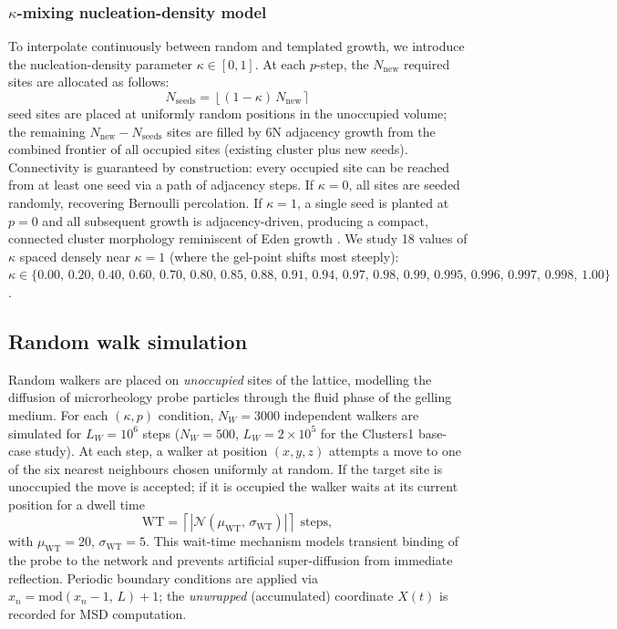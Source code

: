 \subsubsection{$\kappa$-mixing nucleation-density model}

To interpolate continuously between random and templated growth, we introduce the nucleation-density parameter $\kappa \in [0, 1]$. At each $p$-step, the $N_\mathrm{new}$ required sites are allocated as follows:
\begin{equation}
  N_\mathrm{seeds} = \left\lfloor (1-\kappa)\, N_\mathrm{new} \right\rceil
  \label{eq:nseeds}
\end{equation}
seed sites are placed at uniformly random positions in the unoccupied volume; the remaining $N_\mathrm{new} - N_\mathrm{seeds}$ sites are filled by 6N adjacency growth from the combined frontier of all occupied sites (existing cluster plus new seeds). Connectivity is guaranteed by construction: every occupied site can be reached from at least one seed via a path of adjacency steps. If $\kappa = 0$, all sites are seeded randomly, recovering Bernoulli percolation. If $\kappa = 1$, a single seed is planted at $p = 0$ and all subsequent growth is adjacency-driven, producing a compact, connected cluster morphology reminiscent of Eden growth \citep{Eden1961}. We study 18 values of $\kappa$ spaced densely near $\kappa = 1$ (where the gel-point shifts most steeply): $\kappa \in \{0.00,\, 0.20,\, 0.40,\, 0.60,\, 0.70,\, 0.80,\, 0.85,\, 0.88,\, 0.91,\, 0.94,\, 0.97,\, 0.98,\, 0.99,\, 0.995,\, 0.996,\, 0.997,\, 0.998,\, 1.00\}$.

\subsection{Random walk simulation}

Random walkers are placed on \emph{unoccupied} sites of the lattice, modelling the diffusion of microrheology probe particles through the fluid phase of the gelling medium. For each $(\kappa, p)$ condition, $N_W = 3000$ independent walkers are simulated for $L_W = 10^6$ steps ($N_W = 500$, $L_W = 2\times 10^5$ for the Clusters1 base-case study). At each step, a walker at position $(x, y, z)$ attempts a move to one of the six nearest neighbours chosen uniformly at random. If the target site is unoccupied the move is accepted; if it is occupied the walker waits at its current position for a dwell time
\begin{equation}
  \mathrm{WT} = \left\lceil \left|\mathcal{N}(\mu_\mathrm{WT},\, \sigma_\mathrm{WT})\right| \right\rceil \text{ steps},
  \label{eq:wt}
\end{equation}
with $\mu_\mathrm{WT} = 20$, $\sigma_\mathrm{WT} = 5$. This wait-time mechanism models transient binding of the probe to the network and prevents artificial super-diffusion from immediate reflection. Periodic boundary conditions are applied via $x_n = \mathrm{mod}(x_n - 1,\, L) + 1$; the \emph{unwrapped} (accumulated) coordinate $X(t)$ is recorded for MSD computation.

